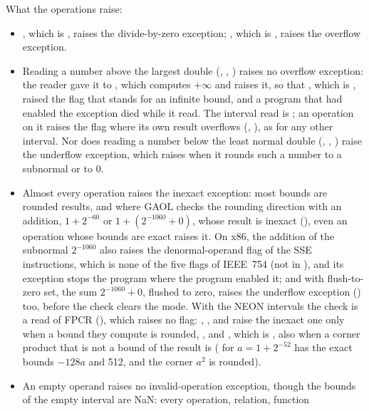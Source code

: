 \documentclass[12pt,a4paper,twoside,openright]{book}
\begin{document}
\noindent
What the operations raise:
\begin{itemize}
\item {}, which is , raises the
  divide-by-zero exception; , which is
  , raises the overflow exception.
\item Reading a number above the largest double (, ,
  ) raises no overflow exception: the reader gave it to
  , which computes $+\infty$ and raises it, so that
  , which is , raised the flag that stands for an
  infinite bound, and a program that had enabled the exception died while it
  read. The interval read is ; an operation on
  it raises the flag where its own result overflows (,
  ), as for any other interval. Nor does reading a number
  below the least normal double (, ,
  ) raise the underflow exception, which 
  raises when it rounds such a number to a subnormal or to $0$.\newinvfive
\item Almost every operation raises the inexact exception: most bounds are
  rounded results, and where GAOL checks the rounding direction with an
  addition, $1+2^{-60}$ or $1+(2^{-1060}+0)$, whose result is inexact
  (), even an operation whose bounds are exact
  raises it. On x86, the addition of the subnormal $2^{-1060}$ also raises
  the denormal-operand flag of the SSE instructions, which is none of the five
  flags of IEEE~754 (not in ), and its exception stops
  the program where the program enabled it; and with flush-to-zero set, the
  sum $2^{-1060}+0$, flushed to zero, raises the underflow exception
  () too, before the check clears the mode. With the NEON
  intervals the check is a read of FPCR (), which raises no
  flag: \code{+}, \code{-}, \code{/} and  raise the inexact one
  only when a bound they compute is rounded, \code{*},  and
  , which is , also when a corner product that is
  not a bound of the result is (\code{[-a, 128] * [-a, 4]} for
  $a = 1 + 2^{-52}$ has the exact bounds $-128a$ and 512, and the corner
  $a^2$ is rounded).\newinvfive
\item An empty operand raises no invalid-operation exception, though the
  bounds of the empty interval are NaN: every operation, relation, function

\end{itemize}
\end{document}

